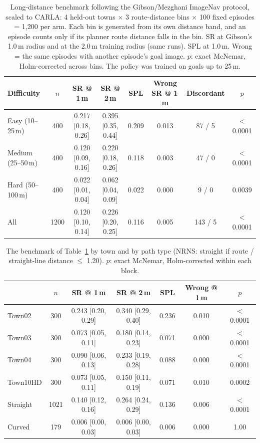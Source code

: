\begin{table}[t]
\centering
\caption{Long-distance benchmark following the Gibson/Mezghani ImageNav protocol,
scaled to CARLA: 4 held-out towns $\times$ 3 route-distance bins $\times$ 100
fixed episodes = 1{,}200 per arm. Each bin is generated from its own distance
band, and an episode counts only if its planner route distance falls in the bin.
SR at Gibson's 1.0\,m radius and at the 2.0\,m training radius (same runs). SPL
at 1.0\,m. Wrong = the same episodes with another episode's goal image. $p$:
exact McNemar, Holm-corrected across bins. The policy was trained on goals up to
25\,m.}
\label{tab:benchmark}
\begin{tabular}{lccccccc}
\toprule
Difficulty & $n$ & SR @ 1\,m & SR @ 2\,m & SPL & Wrong SR @ 1\,m & Discordant & $p$ \\
\midrule
Easy (10--25\,m) & 400 & 0.217 \tiny[0.18, 0.26] & 0.395 \tiny[0.35, 0.44] & 0.209 & 0.013 & 87 / 5 & $<$0.0001 \\
Medium (25--50\,m) & 400 & 0.120 \tiny[0.09, 0.16] & 0.220 \tiny[0.18, 0.26] & 0.118 & 0.003 & 47 / 0 & $<$0.0001 \\
Hard (50--100\,m) & 400 & 0.022 \tiny[0.01, 0.04] & 0.062 \tiny[0.04, 0.09] & 0.022 & 0.000 & 9 / 0 & 0.0039 \\
\midrule
All & 1200 & 0.120 \tiny[0.10, 0.14] & 0.226 \tiny[0.20, 0.25] & 0.116 & 0.005 & 143 / 5 & $<$0.0001 \\
\bottomrule
\end{tabular}
\end{table}

\begin{table}[t]
\centering
\caption{The benchmark of Table~\ref{tab:benchmark} by town and by path type
(NRNS: straight if route / straight-line distance $\leq$ 1.20). $p$: exact
McNemar, Holm-corrected within each block.}
\label{tab:benchmark-breakdown}
\begin{tabular}{lcccccc}
\toprule
 & $n$ & SR @ 1\,m & SR @ 2\,m & SPL & Wrong @ 1\,m & $p$ \\
\midrule
Town02 & 300 & 0.243 \tiny[0.20, 0.29] & 0.340 \tiny[0.29, 0.40] & 0.236 & 0.010 & $<$0.0001 \\
Town03 & 300 & 0.073 \tiny[0.05, 0.11] & 0.180 \tiny[0.14, 0.23] & 0.071 & 0.000 & $<$0.0001 \\
Town04 & 300 & 0.090 \tiny[0.06, 0.13] & 0.233 \tiny[0.19, 0.28] & 0.088 & 0.000 & $<$0.0001 \\
Town10HD & 300 & 0.073 \tiny[0.05, 0.11] & 0.150 \tiny[0.11, 0.19] & 0.071 & 0.010 & 0.0002 \\
\midrule
Straight & 1021 & 0.140 \tiny[0.12, 0.16] & 0.264 \tiny[0.24, 0.29] & 0.136 & 0.006 & $<$0.0001 \\
Curved & 179 & 0.006 \tiny[0.00, 0.03] & 0.006 \tiny[0.00, 0.03] & 0.006 & 0.000 & 1.00 \\
\bottomrule
\end{tabular}
\end{table}

